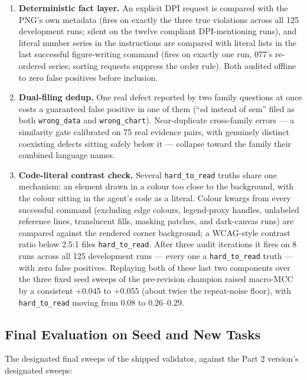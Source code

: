 \documentclass[11pt]{article}
\begin{document}
\begin{enumerate}
  \texttt{hard\_to\_read}) and the arbitration call is gone --- one
  model call per positive run saved.
\item \textbf{Deterministic fact layer.} An explicit DPI request is
  compared with the PNG's own metadata (fires on exactly the three true
  violations across all 125 development runs; silent on the twelve
  compliant DPI-mentioning runs), and literal number series in the
  instructions are compared with literal lists in the last successful
  figure-writing command (fires on exactly one run, 077's re-ordered
  series; sorting requests suppress the order rule). Both audited
  offline to zero false positives before inclusion.
\item \textbf{Dual-filing dedup.} One real defect reported by two family
  questions at once costs a guaranteed false positive in one of them
  (``sd instead of sem'' filed as both \texttt{wrong\_data} and
  \texttt{wrong\_chart}). Near-duplicate cross-family errors --- a
  similarity gate calibrated on 75 real evidence pairs, with genuinely
  distinct coexisting defects sitting safely below it --- collapse toward
  the family their combined language names.
\item \textbf{Code-literal contrast check.} Several
  \texttt{hard\_to\_read} truths share one mechanism: an element drawn
  in a colour too close to the background, with the colour sitting in the
  agent's code as a literal. Colour kwargs from every successful command
  (excluding edge colours, legend-proxy handles, unlabeled reference
  lines, translucent fills, masking patches, and dark-canvas runs) are
  compared against the rendered corner background; a WCAG-style contrast
  ratio below 2.5:1 files \texttt{hard\_to\_read}. After three audit
  iterations it fires on 8 runs across all 125 development runs --- every
  one a \texttt{hard\_to\_read} truth --- with zero false positives.
  Replaying both of these last two components over the three fixed seed
  sweeps of the pre-revision champion raised macro-MCC by a consistent
  $+0.045$ to $+0.055$ (about twice the repeat-noise floor), with
  \texttt{hard\_to\_read} moving from $0.08$ to $0.26$--$0.29$.
\end{enumerate}

\subsection{Final Evaluation on Seed and New Tasks}
The designated final sweeps of the shipped validator, against the Part 2
version's designated sweeps:
\end{document}
